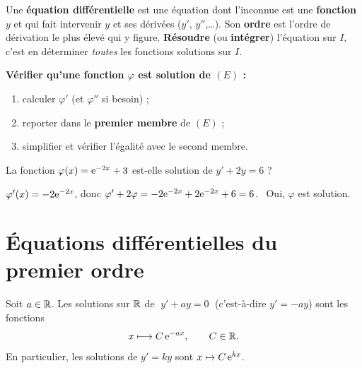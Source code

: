\begin{definition}
	Une \textbf{équation différentielle} est une équation dont l'inconnue est
	une \textbf{fonction} $y$ et qui fait intervenir $y$ et ses dérivées
	($y'$, $y''$,\ldots). Son \textbf{ordre} est l'ordre de dérivation le plus
	élevé qui y figure. \textbf{Résoudre} (ou \textbf{intégrer}) l'équation
	sur $I$, c'est en déterminer \emph{toutes} les fonctions solutions sur $I$.
\end{definition}

\begin{methode}
	\textbf{Vérifier qu'une fonction $\varphi$ est solution de $(E)$ :}
	\begin{enumerate}
		\item calculer $\varphi'$ (et $\varphi''$ si besoin) ;
		\item reporter dans le \textbf{premier membre} de $(E)$ ;
		\item simplifier et vérifier l'égalité avec le second membre.
	\end{enumerate}
\end{methode}

\begin{exemple}
	La fonction $\varphi(x)=\mathrm{e}^{-2x}+3$ est-elle solution de $y'+2y=6$ ?

	$\varphi'(x)=-2\mathrm{e}^{-2x}$, donc
	$\varphi'+2\varphi=-2\mathrm{e}^{-2x}+2\mathrm{e}^{-2x}+6=6$. \ Oui, $\varphi$ est solution.
\end{exemple}


\section{Équations différentielles du premier ordre}

\begin{theoreme}[Équation homogène $y'+ay=0$]
	Soit $a\in\mathbb{R}$. Les solutions sur $\mathbb{R}$ de $\;y'+ay=0\;$ (c'est-à-dire
	$y'=-ay$) sont les fonctions
	\[
	x\longmapsto C\,\mathrm{e}^{-ax},\qquad C\in\mathbb{R}.
	\]
	En particulier, les solutions de $y'=ky$ sont $x\mapsto C\,\mathrm{e}^{kx}$.
\end{theoreme}

